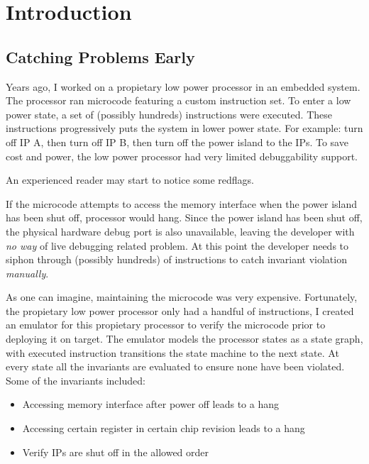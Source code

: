 \chapter{Introduction}

\section{Catching Problems Early}

Years ago, I worked on a propietary low power processor in an embedded system.
The processor ran microcode featuring a custom instruction set. To enter a low
power state, a set of (possibly hundreds) instructions were executed. These
instructions progressively puts the system in lower power state. For example:
turn off IP A, then turn off IP B, then turn off the power island to the IPs. To
save cost and power, the low power processor had very limited debuggability
support.\newline

An experienced reader may start to notice some redflags.\newline

If the microcode attempts to access the memory interface when the power island
has been shut off, processor would hang. Since the power island has been shut
off, the physical hardware debug port is also unavailable, leaving the developer
with \textit{no way} of live debugging related problem. At this point the
developer needs to siphon through (possibly hundreds) of instructions to catch
invariant violation \textit{manually}.\newline

As one can imagine, maintaining the microcode was very expensive. Fortunately,
the propietary low power processor only had a handful of instructions, I created
an emulator for this propietary processor to verify the microcode prior to
deploying it on target. The emulator models the processor states as a state
graph, with executed instruction transitions the state machine to the next
state. At every state all the invariants are evaluated to ensure none have been
violated. Some of the invariants included:
\begin{itemize}
    \item Accessing memory interface after power off leads to a hang
    \item Accessing certain register in certain chip revision leads to a hang 
    \item Verify IPs are shut off in the allowed order
\end{itemize}


